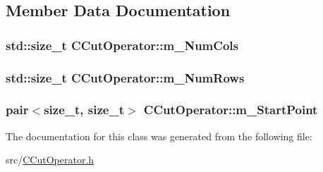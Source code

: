 \subsection{Member Data Documentation}
\subsubsection[{\texorpdfstring{m\+\_\+\+Num\+Cols}{m_NumCols}}]{\setlength{\rightskip}{0pt plus 5cm}std\+::size\+\_\+t C\+Cut\+Operator\+::m\+\_\+\+Num\+Cols\hspace{0.3cm}{\ttfamily [private]}}\hypertarget{classCCutOperator_a79665dc45c36827946d70561b17972e1}{}\label{classCCutOperator_a79665dc45c36827946d70561b17972e1}
\subsubsection[{\texorpdfstring{m\+\_\+\+Num\+Rows}{m_NumRows}}]{\setlength{\rightskip}{0pt plus 5cm}std\+::size\+\_\+t C\+Cut\+Operator\+::m\+\_\+\+Num\+Rows\hspace{0.3cm}{\ttfamily [private]}}\hypertarget{classCCutOperator_af8d34f5712a90c9969823f75a719dc1b}{}\label{classCCutOperator_af8d34f5712a90c9969823f75a719dc1b}
\subsubsection[{\texorpdfstring{m\+\_\+\+Start\+Point}{m_StartPoint}}]{\setlength{\rightskip}{0pt plus 5cm}pair$<$size\+\_\+t, size\+\_\+t$>$ C\+Cut\+Operator\+::m\+\_\+\+Start\+Point\hspace{0.3cm}{\ttfamily [private]}}\hypertarget{classCCutOperator_aa58b7138e83bd58cc64f8fac3325ce80}{}\label{classCCutOperator_aa58b7138e83bd58cc64f8fac3325ce80}


The documentation for this class was generated from the following file\+:\begin{DoxyCompactItemize}
\item 
src/\hyperlink{CCutOperator_8h}{C\+Cut\+Operator.\+h}\end{DoxyCompactItemize}
